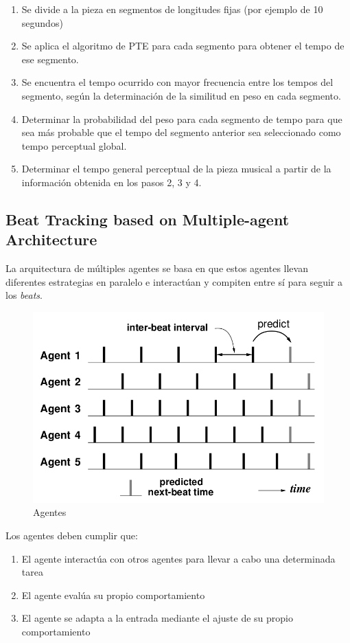 \documentclass[12pt,a4paper,titlepage]{report}
\begin{document}
\begin{enumerate}
\item Se divide a la pieza en segmentos de longitudes fijas (por ejemplo de 10 segundos)
\item Se aplica el algoritmo de PTE para cada segmento para obtener el tempo de ese segmento.
\item Se encuentra el tempo ocurrido con mayor frecuencia entre los tempos del segmento, según la determinación de la similitud en peso en cada segmento.
\item Determinar la probabilidad del peso para cada segmento de tempo para que sea más probable que el tempo del segmento anterior sea seleccionado como tempo perceptual global.
\item Determinar el tempo general perceptual de la pieza musical a partir de la información obtenida en los pasos 2, 3 y 4.
\end{enumerate}


\subsection*{Beat Tracking based on Multiple-agent Architecture}

La arquitectura de múltiples agentes se basa en que estos agentes llevan diferentes estrategias en paralelo e interactúan y compiten entre sí para seguir a los \emph{beats}.\\

\begin{figure}
	\vspace{-10pt}
	\begin{center}
	\includegraphics[width=.4\textwidth]{./pics/agents.jpg}
	\end{center}
	\vspace{-10pt}
	\caption{Agentes}
	\label{fig:agents}
	\vspace{-40pt}
\end{figure}

Los agentes deben cumplir que:
\begin{enumerate}
\item El agente interactúa con otros agentes para llevar a cabo una determinada tarea
\item El agente evalúa su propio comportamiento
\item El agente se adapta a la entrada mediante el ajuste de su propio comportamiento
\end{enumerate}
\end{document}
